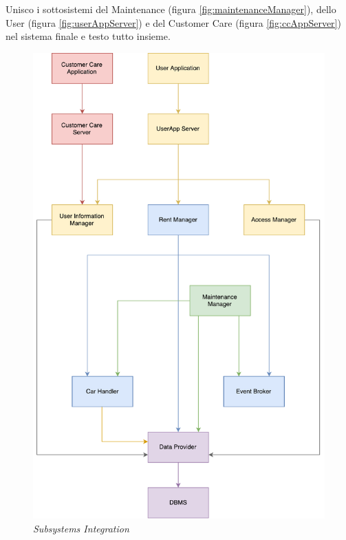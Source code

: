 Unisco i sottosistemi del Maintenance (figura \ref{fig:maintenanceManager}), dello User (figura \ref{fig:userAppServer})  e del Customer Care (figura \ref{fig:ccAppServer}) nel sistema finale e testo tutto insieme. 

	\begin{figure}[h]
			\centering
			\includegraphics[width=0.8\linewidth]{img/subsystemIntegration}
			\caption{
				\label{fig:subsystemIntegration} 
				\emph{Subsystems Integration}
			}
		\end{figure}
